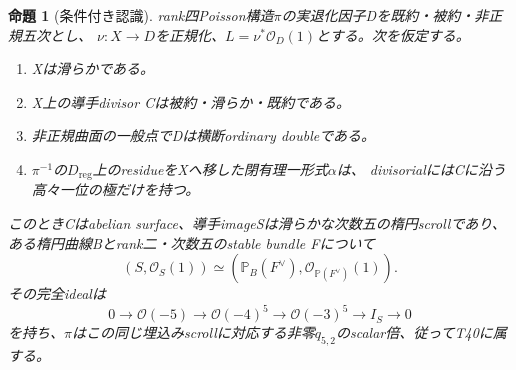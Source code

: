 \documentclass[a4paper,11pt]{ltjsarticle}
\newtheorem{proposition}{命題}[section]
\theoremstyle{definition}
\begin{document}
\begin{proposition}[条件付き認識]\label{prop:ordinary-double-t40}
rank四Poisson構造$\pi$の実退化因子Dを既約・被約・非正規五次とし、
$\nu:X\to D$を正規化、$L=\nu^*\mathcal O_D(1)$とする。次を仮定する。
\begin{enumerate}
\item Xは滑らかである。
\item X上の導手divisor Cは被約・滑らか・既約である。
\item 非正規曲面の一般点でDは横断ordinary doubleである。
\item $\pi^{-1}$の$D_{\mathrm{reg}}$上のresidueをXへ移した閉有理一形式$\alpha$は、
      divisorialにはCに沿う高々一位の極だけを持つ。
\end{enumerate}
このときCはabelian surface、導手imageSは滑らかな次数五の楕円scrollであり、
ある楕円曲線Bとrank二・次数五のstable bundle Fについて
\[
 (S,\mathcal O_S(1))\simeq
 (\mathbb P_B(F^\vee),\mathcal O_{\mathbb P(F^\vee)}(1)).
\]
その完全idealは
\[
 0\longrightarrow\mathcal O(-5)\longrightarrow\mathcal O(-4)^5
 \longrightarrow\mathcal O(-3)^5\longrightarrow I_S\longrightarrow0
\]
を持ち、$\pi$はこの同じ埋込みscrollに対応する非零$q_{5,2}$のscalar倍、従ってT40に属する。
\end{proposition}
\end{document}
